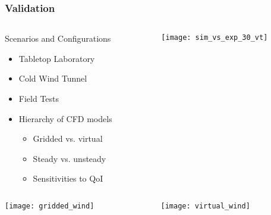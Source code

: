 \documentclass[mathserif]{beamer}
\begin{document}
%
%
%
\begin{frame}
 \frametitle{Validation}

 \begin{columns}[]
  \begin{column}{0.55\linewidth}

   \begin{block}{Scenarios and Configurations}
    \begin{itemize}
     \item Tabletop Laboratory
     \item Cold Wind Tunnel
     \item Field Tests
     \item Hierarchy of CFD models 
	   \begin{itemize}
	    \item Gridded vs. virtual
	    \item Steady vs. unsteady
	    \item Sensitivities to QoI
	   \end{itemize}
    \end{itemize}
    \end{block}

  \end{column}

  \begin{column}{0.45\linewidth}
  \begin{center}
   \texttt{[image: sim\_vs\_exp\_30\_vt]}
  \end{center}
  \end{column}
  \end{columns}

 
 \begin{columns}[]
  \begin{column}{0.55\linewidth}
   
   \begin{center}
    \texttt{[image: gridded\_wind]}
   \end{center}
\end{column}
 \begin{column}{0.55\linewidth}
   \begin{center}
    \texttt{[image: virtual\_wind]}
   \end{center}
\end{column}
 \end{columns}


\end{frame}
\end{document}
